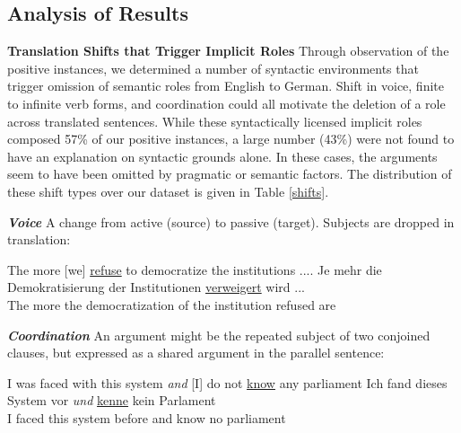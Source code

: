 \documentclass[11pt]{article}
\begin{document}
\subsection{Analysis of Results}

{\bf  \flushleft Translation Shifts that Trigger Implicit Roles}
Through observation of the positive instances, we determined a number of syntactic environments that trigger omission of semantic roles from English to German.
Shift in voice, finite to infinite verb forms, and coordination could all motivate the deletion of a role across translated sentences. While these syntactically licensed implicit roles composed 57{\%} of our positive instances, a large number (43{\%}) were not found to have an explanation on syntactic grounds alone. In these cases, the arguments seem to have been omitted by pragmatic or semantic factors. The distribution of these shift types over our dataset is given in Table \ref{shifts}.

 {\bf \flushleft \textit{Voice}} A change  from active (source) to passive (target). Subjects are dropped in translation:
\begin{exe}
\ex  The more [we] \underline{refuse} to democratize the institutions ....
 \vspace*{-2mm}
\gll Je mehr die Demokratisierung der Institutionen \underline{verweigert} wird  ...\\
The more the democratization {of the} institution refused are\\
\end{exe}

{\bf \flushleft \textit{Coordination}} An argument might be the repeated subject of two conjoined clauses, but expressed as a shared argument in the parallel sentence:

\begin{exe}
\ex  I was faced with this system \textit{and} [I] do not \underline{know} any parliament
 \vspace*{-2mm}
\gll Ich fand dieses System vor \textit{und} \underline{kenne} kein Parlament\\
I faced this system before and  know no parliament\\
\end{exe}
\end{document}
